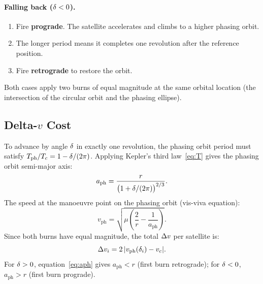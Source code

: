 \paragraph{Falling back ($\delta < 0$).}
\begin{enumerate}
  \item Fire \textbf{prograde}. The satellite accelerates and climbs to
        a higher phasing orbit.
  \item The longer period means it completes one revolution after the
        reference position.
  \item Fire \textbf{retrograde} to restore the orbit.
\end{enumerate}

Both cases apply two burns of equal magnitude at the same orbital
location (the intersection of the circular orbit and the phasing ellipse).

\subsection{Delta-$v$ Cost}

To advance by angle $\delta$ in exactly one revolution, the phasing orbit
period must satisfy $T_\text{ph}/T_c = 1 - \delta/(2\pi)$.
Applying Kepler's third law~\eqref{eq:T} gives the phasing orbit
semi-major axis:
\begin{equation}
  a_\text{ph} = \frac{r}{\bigl(1 + \delta/(2\pi)\bigr)^{2/3}}.
  \label{eq:aph}
\end{equation}
The speed at the manoeuvre point on the phasing orbit
(vis-viva equation):
\begin{equation}
  v_\text{ph} = \sqrt{\mu\!\left(\frac{2}{r} - \frac{1}{a_\text{ph}}\right)}.
  \label{eq:vph}
\end{equation}
Since both burns have equal magnitude, the total $\Delta v$ per satellite is:
\begin{equation}
  \Delta v_i = 2\,|v_\text{ph}(\delta_i) - v_c|.
  \label{eq:dv}
\end{equation}
For $\delta > 0$, equation~\eqref{eq:aph} gives $a_\text{ph} < r$ (first
burn retrograde); for $\delta < 0$, $a_\text{ph} > r$ (first burn prograde).
